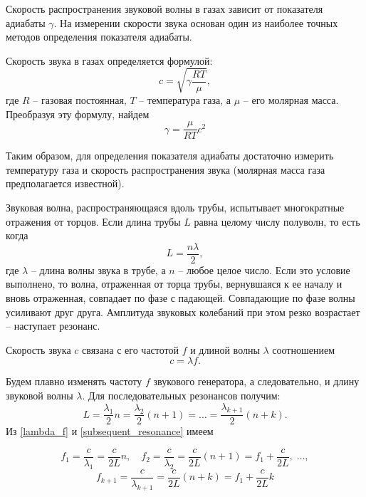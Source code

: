 \documentclass[a4paper,12pt]{article}
\begin{document}
Скорость распространения звуковой волны в газах зависит от показателя адиабаты $ \gamma $. На измерении скорости звука основан один из наиболее точных методов определения показателя адиабаты.

Скорость звука в газах определяется формулой:
\begin{equation}\label{speed_of_sound}
  c = \sqrt{\gamma \frac{RT}{\mu}},
\end{equation}
где $ R $ -- газовая постоянная, $ T $ -- температура газа, а $ \mu $ -- его молярная масса. Преобразуя эту формулу, найдем
\begin{equation}\label{gamma}
  \boxed{\gamma = \frac{\mu}{RT}c^2}
\end{equation}

Таким образом, для определения показателя адиабаты достаточно измерить температуру газа и скорость распространения звука (молярная масса газа предполагается известной).

Звуковая волна, распространяющаяся вдоль трубы, испытывает многократные отражения от торцов. Если длина трубы $ L $ равна целому числу полуволн, то есть когда \[ L= \frac{n\lambda}{2}, \] где $ \lambda $ -- длина волны звука в трубе, а $ n $ -- любое целое число. Если это условие выполнено, то волна, отраженная от торца трубы, вернувшаяся к ее началу и вновь отраженная, совпадает по фазе с падающей. Совпадающие по фазе волны усиливают друг друга. Амплитуда звуковых колебаний при этом резко возрастает -- наступает резонанс.

Скорость звука $ c $ связана с его частотой $ f $ и длиной волны $ \lambda $ соотношением
\begin{equation}\label{lambda_f}
  c=\lambda f.
\end{equation}

Будем плавно изменять частоту $ f $ звукового генератора, а следовательно, и длину звуковой волны $ \lambda $. Для последовательных резонансов получим:
\begin{equation}\label{subsequent_resonance}
  L = \frac{\lambda_1}{2}n = \frac{\lambda_2}{2}(n + 1) = \dots = \frac{\lambda_{k + 1}}{2}(n + k).
\end{equation}
Из \eqref{lambda_f} и \eqref{subsequent_resonance} имеем

\[ f_1 = \frac{c}{\lambda_1} = \frac{c}{2L}n, \quad f_2 = \frac{c}{\lambda_2} = \frac{c}{2L}(n + 1) = f_1 + \frac{c}{2L}, \;\dots, \]
\begin{equation}\label{freq_coef}
  f_{k+1} = \frac{c}{\lambda_{k+1}} = \frac{c}{2L}(n + k) = f_1 + \frac{c}{2L}k
\end{equation}
\end{document}
